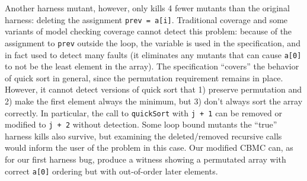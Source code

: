 \documentclass[conference]{IEEEtran}
\begin{document}
Another harness mutant, however, only kills 4 fewer mutants than the
original harness: deleting the assignment {\tt prev = a[i]}.
Traditional coverage and some variants of model checking coverage
cannot detect this problem: because of the assignment to {\tt prev}
outside the loop, the variable is used in the specification, and in
fact used to detect many faults (it eliminates any mutants that can
cause {\tt a[0]} to not be the least element in the array).  The
specification ``covers'' the behavior of quick sort in general, since
the permutation requirement remains in place.  However, it cannot detect
versions of quick sort that 1) preserve permutation and 2) make the first
element always the minimum, but 3) don't always sort the array correctly.  In
particular, the call to {\tt quickSort} with {\tt j + 1} can be
removed or modified to {\tt j + 2} without detection.  Some loop bound
mutants the ``true'' harness kills also survive, but examining the
deleted/removed recursive calls would inform the user of the problem
in this case.  Our modified CBMC can, as for our first harness bug,
produce a witness showing a permutated array with correct {\tt a[0]}
ordering but with out-of-order later elements.
\end{document}
